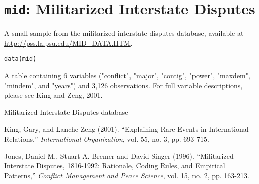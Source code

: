  \section{{\tt mid}: Militarized Interstate Disputes}\label{ss:mid}
\begin{Description}\relax
A small sample from the militarized interstate disputes database,
available at \url{http://pss.la.psu.edu/MID_DATA.HTM}.
\end{Description}
\begin{Usage}
\begin{verbatim}data(mid)\end{verbatim}
\end{Usage}
\begin{Format}\relax
A table containing 6 variables ("conflict", "major", "contig", 
"power", "maxdem", "mindem", and "years") and 3,126 observations.  For
full variable descriptions, please see King and Zeng, 2001.
\end{Format}
\begin{Source}\relax
Militarized Interstate Disputes database
\end{Source}
\begin{References}\relax
King, Gary, and Lanche Zeng (2001).  ``Explaining Rare Events in
International Relations,'' \emph{International Organization}, vol. 55,
no. 3, pp. 693-715.  

Jones, Daniel M., Stuart A. Bremer and David Singer (1996).  ``Militarized
Interstate Disputes, 1816-1992: Rationale, Coding Rules, and Empirical
Patterns,'' \emph{Conflict Management and Peace Science}, vol. 15,
no. 2, pp. 163-213.
\end{References}


